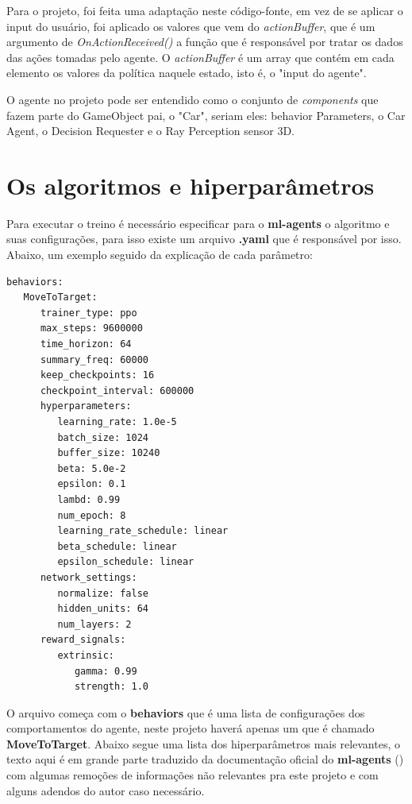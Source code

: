 Para o projeto, foi feita uma adaptação neste código-fonte, em vez de se aplicar o input do usuário, foi aplicado os valores que vem do \textit{actionBuffer}, que é um argumento de \textit{OnActionReceived()} a função que é responsável por tratar os dados das ações tomadas pelo agente. O \textit{actionBuffer} é um array que contém em cada elemento os valores da política naquele estado, isto é, o "input do agente".

O agente no projeto pode ser entendido como o conjunto de \textit{components} que fazem parte do GameObject pai, o "Car", seriam eles: behavior Parameters, o Car Agent, o Decision Requester e o Ray Perception sensor 3D. 

\section{Os algoritmos e hiperparâmetros}\label{algoritmos}
Para executar o treino é necessário especificar para o \textbf{ml-agents} o algoritmo e suas configurações, para isso existe um arquivo \textbf{.yaml} que é responsável por isso. Abaixo, um exemplo seguido da explicação de cada parâmetro:

\begin{lstlisting}
behaviors:
   MoveToTarget:
      trainer_type: ppo
      max_steps: 9600000
      time_horizon: 64
      summary_freq: 60000
      keep_checkpoints: 16     
      checkpoint_interval: 600000
      hyperparameters:
         learning_rate: 1.0e-5
         batch_size: 1024
         buffer_size: 10240
         beta: 5.0e-2
         epsilon: 0.1
         lambd: 0.99
         num_epoch: 8
         learning_rate_schedule: linear
         beta_schedule: linear
         epsilon_schedule: linear
      network_settings:
         normalize: false
         hidden_units: 64
         num_layers: 2
      reward_signals:
         extrinsic:
            gamma: 0.99
            strength: 1.0
\end{lstlisting}

O arquivo começa com o \textbf{behaviors} que é uma lista de configurações dos comportamentos do agente, neste projeto haverá apenas um que é chamado \textbf{MoveToTarget}. Abaixo segue uma lista dos hiperparâmetros mais relevantes, o texto aqui é em grande parte traduzido da documentação oficial do \textbf{ml-agents} () com algumas remoções de informações não relevantes pra este projeto e com alguns adendos do autor caso necessário.

